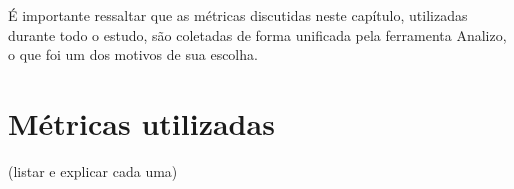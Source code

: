 É importante ressaltar que as métricas discutidas neste capítulo, utilizadas durante todo o estudo, são coletadas de forma unificada pela ferramenta Analizo, o que foi um dos motivos de sua escolha.

\section{Métricas utilizadas}

(listar e explicar cada uma)
